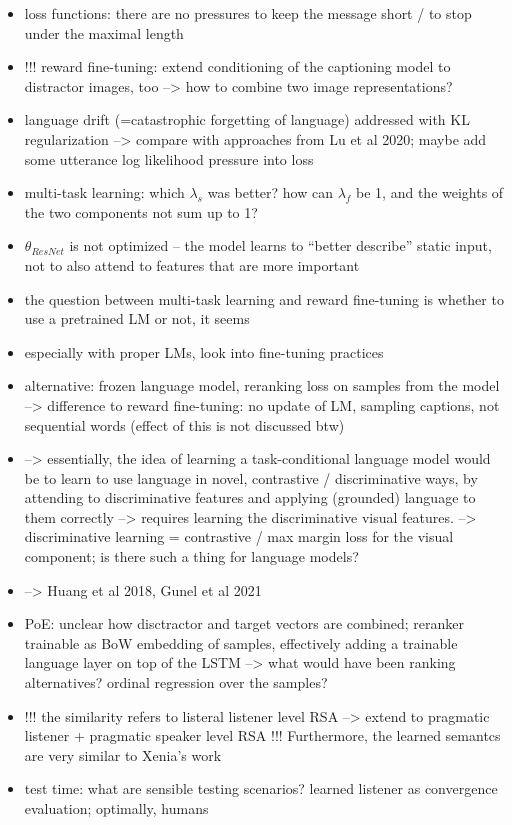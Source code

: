 \documentclass[11pt,letterpaper]{article}
\begin{document}
\begin{itemize}
	\item loss functions: there are no pressures to keep the message short / to stop under the maximal length
	\item !!! reward fine-tuning: extend conditioning of the captioning model to distractor images, too --> how to combine two image representations?
	\item language drift (=catastrophic forgetting of language) addressed with KL regularization --> compare with approaches from Lu et al 2020; maybe add some utterance log likelihood pressure into loss
	\item multi-task learning: which $\lambda_s$ was better? how can $\lambda_f$ be 1, and the weights of the two components not sum up to 1?
	\item $\theta_{ResNet}$ is not optimized -- the model learns to ``better describe'' static input, not to also attend to features that are more important
	\item the question between multi-task learning and reward fine-tuning is whether to use a pretrained LM or not, it seems
	\item especially with proper LMs, look into fine-tuning practices
	\item alternative: frozen language model, reranking loss on samples from the model --> difference to reward fine-tuning: no update of LM, sampling captions, not sequential words (effect of this is not discussed btw)
	\item --> essentially, the idea of learning a task-conditional language model would be to learn to use language in novel, contrastive / discriminative ways, by attending to discriminative features and applying (grounded) language to them correctly --> requires learning the discriminative visual features. --> discriminative learning = contrastive / max margin loss for the visual component; is there such a thing for language models?
	\item --> Huang et al 2018, Gunel et al 2021
	\item PoE: unclear how disctractor and target vectors are combined; reranker trainable as BoW embedding of samples, effectively adding a trainable language layer on top of the LSTM --> what would have been ranking alternatives? ordinal regression over the samples?
	\item !!! the similarity refers to listeral listener level RSA --> extend to pragmatic listener + pragmatic speaker level RSA !!! Furthermore, the learned semantcs are very similar to Xenia's work
	\item test time: what are sensible testing scenarios? learned listener as convergence evaluation; optimally, humans

\end{itemize}
\end{document}
